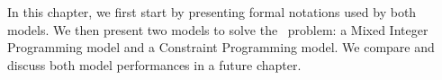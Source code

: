 \documentclass[../../thesis.tex]{subfiles}
\begin{document}
In this chapter, we first start by presenting formal notations used by both models. 
We then present two models to solve the \vone\ problem: a Mixed Integer Programming model and a Constraint Programming model.
We compare and discuss both model performances in a future chapter.
\end{document}
